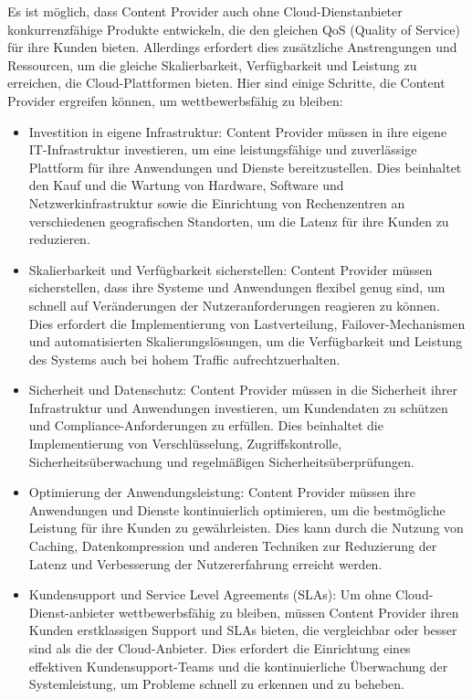 \documentclass[../vs-script-first-v01.tex]{subfiles}
\begin{document}
Es ist möglich, dass Content Provider auch ohne Cloud-Dienstanbieter konkurrenzfähige Produkte entwickeln, die den gleichen QoS (Quality of Service) für ihre Kunden bieten. Allerdings erfordert dies zusätzliche Anstrengungen und Ressourcen, um die gleiche Skalierbarkeit, Verfügbarkeit und Leistung zu erreichen, die Cloud-Plattformen bieten. Hier sind einige Schritte, die Content Provider ergreifen können, um wettbewerbsfähig zu bleiben:
\begin{itemize}
\item Investition in eigene Infrastruktur: Content Provider müssen in ihre eigene IT-Infrastruktur investieren, um eine leistungsfähige und zuverlässige Plattform für ihre Anwendungen und Dienste bereitzustellen. Dies beinhaltet den Kauf und die Wartung von Hardware, Software und Netzwerkinfrastruktur sowie die Einrichtung von Rechenzentren an verschiedenen geografischen Standorten, um die Latenz für ihre Kunden zu reduzieren.
\item Skalierbarkeit und Verfügbarkeit sicherstellen: Content Provider müssen sicherstellen, dass ihre Systeme und Anwendungen flexibel genug sind, um schnell auf Veränderungen der Nutzeranforderungen reagieren zu können. Dies erfordert die Implementierung von Lastverteilung, Failover-Mechanismen und automatisierten Skalierungslösungen, um die Verfügbarkeit und Leistung des Systems auch bei hohem Traffic aufrechtzuerhalten.
\item Sicherheit und Datenschutz: Content Provider müssen in die Sicherheit ihrer Infrastruktur und Anwendungen investieren, um Kundendaten zu schützen und Compliance-Anforderungen zu erfüllen. Dies beinhaltet die Implementierung von Verschlüsselung, Zugriffskontrolle, Sicherheitsüberwachung und regelmäßigen Sicherheitsüberprüfungen.
\item Optimierung der Anwendungsleistung: Content Provider müssen ihre Anwendungen und Dienste kontinuierlich optimieren, um die bestmögliche Leistung für ihre Kunden zu gewährleisten. Dies kann durch die Nutzung von Caching, Datenkompression und anderen Techniken zur Reduzierung der Latenz und Verbesserung der Nutzererfahrung erreicht werden.
\item Kundensupport und Service Level Agreements (SLAs): Um ohne Cloud-Dienst-anbieter wettbewerbsfähig zu bleiben, müssen Content Provider ihren Kunden erstklassigen Support und SLAs bieten, die vergleichbar oder besser sind als die der Cloud-Anbieter. Dies erfordert die Einrichtung eines effektiven Kundensupport-Teams und die kontinuierliche Überwachung der Systemleistung, um Probleme schnell zu erkennen und zu beheben.
\end{itemize}
\end{document}
